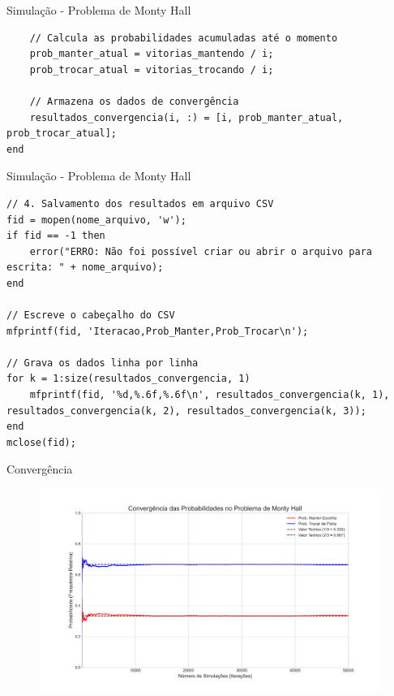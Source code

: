 \begin{frame}[fragile]{Simulação - Problema de Monty Hall}
\begin{lstlisting}
    // Calcula as probabilidades acumuladas até o momento
    prob_manter_atual = vitorias_mantendo / i;
    prob_trocar_atual = vitorias_trocando / i;

    // Armazena os dados de convergência
    resultados_convergencia(i, :) = [i, prob_manter_atual, prob_trocar_atual];
end      
\end{lstlisting}

\end{frame}

\begin{frame}[fragile]{Simulação - Problema de Monty Hall}
\begin{lstlisting}
// 4. Salvamento dos resultados em arquivo CSV
fid = mopen(nome_arquivo, 'w');
if fid == -1 then
    error("ERRO: Não foi possível criar ou abrir o arquivo para escrita: " + nome_arquivo);
end

// Escreve o cabeçalho do CSV
mfprintf(fid, 'Iteracao,Prob_Manter,Prob_Trocar\n');

// Grava os dados linha por linha
for k = 1:size(resultados_convergencia, 1)
    mfprintf(fid, '%d,%.6f,%.6f\n', resultados_convergencia(k, 1), resultados_convergencia(k, 2), resultados_convergencia(k, 3));
end
mclose(fid);
\end{lstlisting}
\end{frame}

\begin{frame}[fragile]{Convergência}
 \begin{figure}
    \centering
    \includegraphics[width=0.9\linewidth]{figures/convergencia_monty_hall.png}
 \end{figure}
\end{frame}

